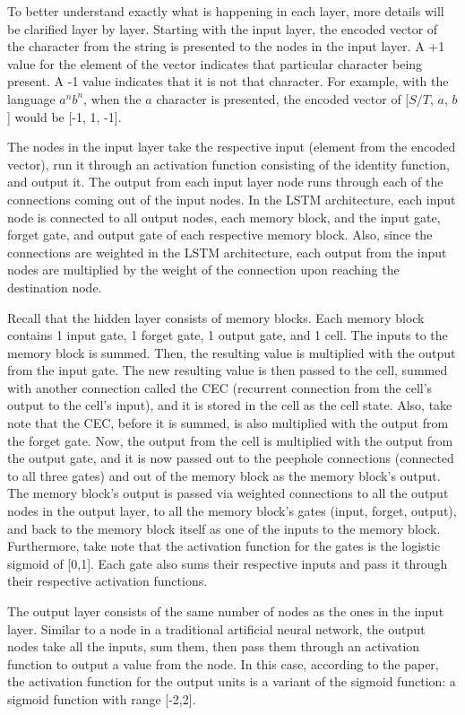 \documentclass[11pt,letterpaper]{article}
\begin{document}
To better understand exactly what is happening in each layer, more details will be clarified layer by layer. Starting with the input layer, the encoded vector of the character from the string is presented to the nodes in the input layer. A +1 value for the element of the vector indicates that particular character being present. A -1 value indicates that it is not that character. For example, with the language $a^nb^n$, when the $a$ character is presented, the encoded vector of [$S/T$, $a$, $b$] would be [-1, 1, -1].

The nodes in the input layer take the respective input (element from the encoded vector), run it through an activation function consisting of the identity function, and output it. The output from each input layer node runs through each of the connections coming out of the input nodes. In the LSTM architecture, each input node is connected to all output nodes, each memory block, and the input gate, forget gate, and output gate of each respective memory block. Also, since the connections are weighted in the LSTM architecture, each output from the input nodes are multiplied by the weight of the connection upon reaching the destination node.

Recall that the hidden layer consists of memory blocks. Each memory block contains 1 input gate, 1 forget gate, 1 output gate, and 1 cell. The inputs to the memory block is summed. Then, the resulting value is multiplied with the output from the input gate. The new resulting value is then passed to the cell, summed with another connection called the CEC (recurrent connection from the cell's output to the cell's input), and it is stored in the cell as the cell state. Also, take note that the CEC, before it is summed, is also multiplied with the output from the forget gate. Now, the output from the cell is multiplied with the output from the output gate, and it is now passed out to the peephole connections (connected to all three gates) and out of the memory block as the memory block's output. The memory block's output is passed via weighted connections to all the output nodes in the output layer, to all the memory block's gates (input, forget, output), and back to the memory block itself as one of the inputs to the memory block. Furthermore, take note that the activation function for the gates is the logistic sigmoid of [0,1]. Each gate also sums their respective inputs and pass it through their respective activation functions. 

The output layer consists of the same number of nodes as the ones in the input layer. Similar to a node in a traditional artificial neural network, the output nodes take all the inputs, sum them, then pass them through an activation function to output a value from the node. In this case, according to the paper, the activation function for the output units is a variant of the sigmoid function: a sigmoid function with range [-2,2]. 
\end{document}
